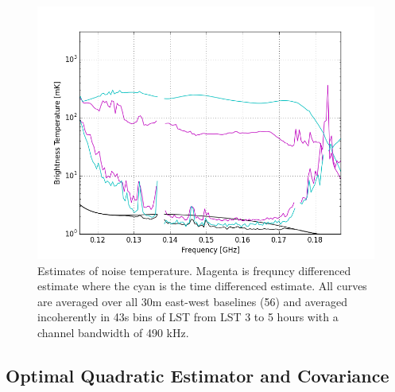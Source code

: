 \documentclass[twocolumn,numberedappendix]{emulateapj}
\begin{document}
\begin{figure}[h!]\centering
\includegraphics[width=\columnwidth, height=.8\columnwidth]{plots/noise_t_35.png}
\caption{Estimates of noise temperature. Magenta is frequncy differenced
estimate where the cyan is the time differenced estimate. All curves are
averaged over all 30m east-west baselines (56) and averaged incoherently in 43s
bins of LST from LST 3 to 5 hours with a channel bandwidth of 490 kHz.}
\label{fig:noise_t}
\end{figure}




\subsection{Optimal Quadratic Estimator and Covariance}
%   
%   
%
%
%
%
%
%
%
%
%
%
%
\end{document}
